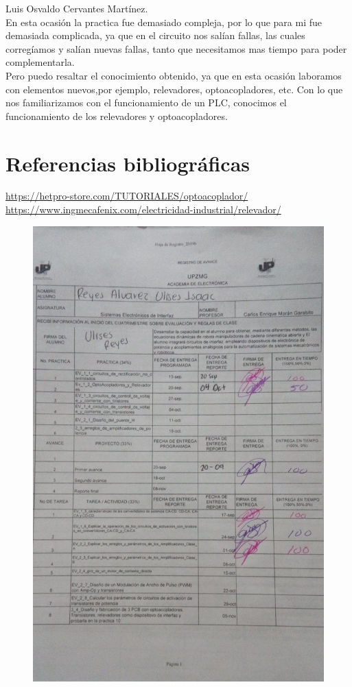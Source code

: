 \documentclass[12pt,a4paper]{article}
\begin{document}
Luis Osvaldo Cervantes Martínez.\\
En esta ocasión la practica fue demasiado compleja, por lo que para mi fue demasiada complicada, ya que en el circuito nos salían fallas, las cuales corregíamos y salían nuevas fallas, tanto que necesitamos mas tiempo para poder complementarla.\\
Pero puedo resaltar el conocimiento obtenido, ya que en esta ocasión laboramos con elementos nuevos,por ejemplo, relevadores, optoacopladores, etc. Con lo que nos familiarizamos con el funcionamiento de un PLC, conocimos el funcionamiento de los relevadores y optoacopladores.\\ 
\newpage
\section{Referencias bibliográficas}
\url{https://hetpro-store.com/TUTORIALES/optoacoplador/}\\
\url{https://www.ingmecafenix.com/electricidad-industrial/relevador/}

\begin{figure}[hbtp]
\centering
\includegraphics[scale=0.4]{Circuito/Firmas.jpeg}
\end{figure}
\end{document}
